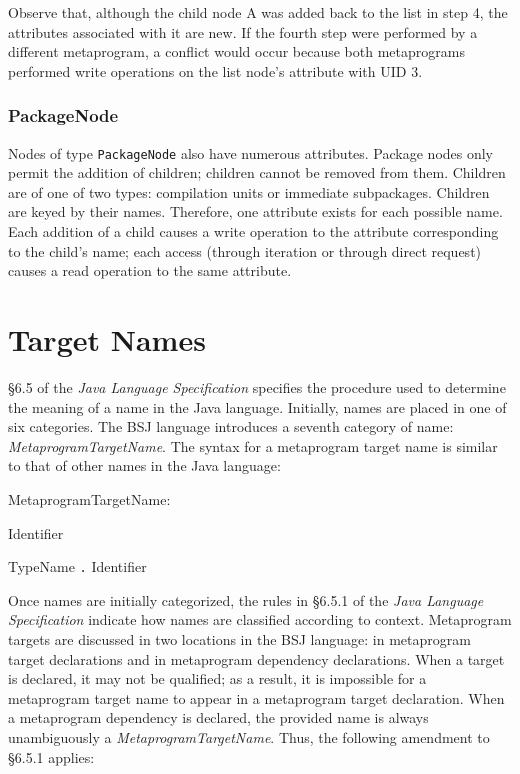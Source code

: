 \documentclass[a4paper,10pt]{report}
\newcommand{\JLS}{\textit{Java Language Specification}}
\newenvironment{grammar}{
    \begin{list}{}{
        \itshape
        \setlength{\partopsep}{\topsep}
        \setlength{\topsep}{0cm}
    }
}{
    \end{list}
}
\begin{document}
Observe that, although the child node A was added back to the list in step 4, the attributes associated with it are new.  If the fourth step were performed by a different metaprogram, a conflict would occur because both metaprograms performed write operations on the list node's attribute with UID 3.

\subsubsection{PackageNode}
\label{secMetaprogDepsAttsPackage}

Nodes of type \verb`PackageNode` also have numerous attributes.  Package nodes only permit the addition of children; children cannot be removed from them.  Children are of one of two types: compilation units or immediate subpackages.  Children are keyed by their names.  Therefore, one attribute exists for each possible name.  Each addition of a child causes a write operation to the attribute corresponding to the child's name; each access (through iteration or through direct request) causes a read operation to the same attribute.

\section{Target Names}
\label{secMetaprogNames}

\S{}6.5 of the \JLS{} specifies the procedure used to determine the meaning of a name in the Java language.  Initially, names are placed in one of six categories.  The BSJ language introduces a seventh category of name: \textit{MetaprogramTargetName}.  The syntax for a metaprogram target name is similar to that of other names in the Java language:

\begin{grammar}
    \item MetaprogramTargetName:
    \begin{grammar}
        \item Identifier
        \item TypeName \verb`.` Identifier
    \end{grammar}
\end{grammar}

Once names are initially categorized, the rules in \S{}6.5.1 of the \JLS{} indicate how names are classified according to context.  Metaprogram targets are discussed in two locations in the BSJ language: in metaprogram target declarations and in metaprogram dependency declarations.  When a target is declared, it may not be qualified; as a result, it is impossible for a metaprogram target name to appear in a metaprogram target declaration.  When a metaprogram dependency is declared, the provided name is always unambiguously a \textit{MetaprogramTargetName}.  Thus, the following amendment to \S{}6.5.1 applies:
\end{document}
